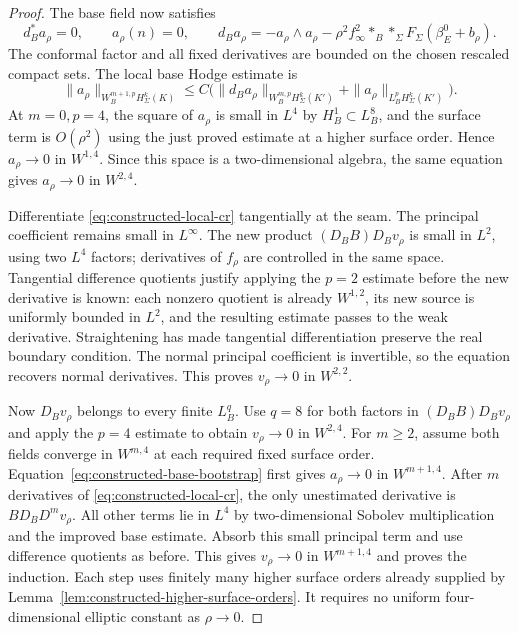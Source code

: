 \documentclass[11pt]{amsart}
\theoremstyle{definition}
\theoremstyle{remark}
\theoremstyle{plain}
\begin{document}
\begin{proof}
The base field now satisfies
\begin{equation}\label{eq:constructed-base-bootstrap}
 d_B^*a_\rho=0,\qquad a_\rho(n)=0,\qquad
 d_Ba_\rho=-a_\rho\wedge a_\rho
       -\rho^2f_\infty^2*_B*_\Sigma F_\Sigma(\beta_E^0+b_\rho).
\end{equation}
The conformal factor and all fixed derivatives are bounded on the
chosen rescaled compact sets. The local base Hodge estimate is
\[
 \|a_\rho\|_{W^{m+1,p}_BH^k_\Sigma(K)}
 \leq C\bigl(\|d_Ba_\rho\|_{W^{m,p}_BH^k_\Sigma(K')}
                          +\|a_\rho\|_{L^p_BH^k_\Sigma(K')}\bigr).
\]
At $m=0,p=4$, the square of $a_\rho$ is small in $L^4$ by
$H^1_B\subset L^8_B$, and the surface term is $O(\rho^2)$ using the
just proved estimate at a higher surface order. Hence $a_\rho\to0$
in $W^{1,4}$. Since this space is a two-dimensional algebra, the same
equation gives $a_\rho\to0$ in $W^{2,4}$.

Differentiate \eqref{eq:constructed-local-cr} tangentially at the seam.
The principal coefficient remains small in $L^\infty$. The new product
$(D_BB)D_Bv_\rho$ is small in $L^2$, using two $L^4$ factors;
derivatives of $f_\rho$ are controlled in the same space. Tangential
difference quotients justify applying the $p=2$ estimate before the
new derivative is known: each nonzero quotient is already $W^{1,2}$,
its new source is uniformly bounded in $L^2$, and the resulting estimate
passes to the weak derivative. Straightening has made tangential
differentiation preserve the real boundary condition. The normal
principal coefficient is invertible, so the equation recovers normal
derivatives. This proves $v_\rho\to0$ in $W^{2,2}$.

Now $D_Bv_\rho$ belongs to every finite $L^q_B$. Use $q=8$ for both
factors in $(D_BB)D_Bv_\rho$ and apply the $p=4$ estimate to obtain
$v_\rho\to0$ in $W^{2,4}$. For $m\geq2$, assume both fields converge
in $W^{m,4}$ at each required fixed surface order.
Equation~\eqref{eq:constructed-base-bootstrap} first gives
$a_\rho\to0$ in $W^{m+1,4}$. After $m$ derivatives of
\eqref{eq:constructed-local-cr}, the only unestimated derivative is
$BD_BD^mv_\rho$. All other terms lie in $L^4$ by two-dimensional
Sobolev multiplication and the improved base estimate. Absorb this
small principal term and use difference quotients as before. This
gives $v_\rho\to0$ in $W^{m+1,4}$ and proves the induction.
Each step uses finitely many higher surface orders already supplied by
Lemma~\ref{lem:constructed-higher-surface-orders}. It requires no
uniform four-dimensional elliptic constant as $\rho\to0$.
\end{proof}
\end{document}
